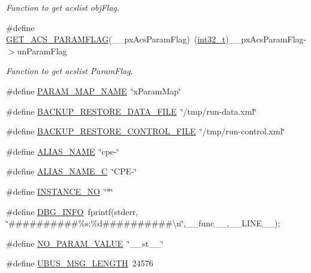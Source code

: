\begin{DoxyCompactItemize}
\begin{DoxyCompactList}\small\item\em Function to get acslist obj\-Flag. \end{DoxyCompactList}\item 
\#define \hyperlink{group__LIBHELP_ga9e0534c6e18bac60deeef94ea78f271b}{G\-E\-T\-\_\-\-A\-C\-S\-\_\-\-P\-A\-R\-A\-M\-F\-L\-A\-G}(\-\_\-\-\_\-px\-Acs\-Param\-Flag)~(\hyperlink{commondefs_8h_a32f2e37ee053cf2ce8ca28d1f74630e5}{int32\-\_\-t})\-\_\-\-\_\-px\-Acs\-Param\-Flag-\/$>$un\-Param\-Flag
\begin{DoxyCompactList}\small\item\em Function to get acslist Param\-Flag. \end{DoxyCompactList}\item 
\#define \hyperlink{group__LIBHELP_ga87909ff79ce67a556f60ca606544e57d}{P\-A\-R\-A\-M\-\_\-\-M\-A\-P\-\_\-\-N\-A\-M\-E}~\char`\"{}x\-Param\-Map\char`\"{}
\item 
\#define \hyperlink{group__LIBHELP_ga2356c4c79efdae03bcd85e11d9178a32}{B\-A\-C\-K\-U\-P\-\_\-\-R\-E\-S\-T\-O\-R\-E\-\_\-\-D\-A\-T\-A\-\_\-\-F\-I\-L\-E}~\char`\"{}/tmp/run-\/data.\-xml\char`\"{}
\item 
\#define \hyperlink{group__LIBHELP_ga0e77cc7711c428b607377d7c5fd22eb3}{B\-A\-C\-K\-U\-P\-\_\-\-R\-E\-S\-T\-O\-R\-E\-\_\-\-C\-O\-N\-T\-R\-O\-L\-\_\-\-F\-I\-L\-E}~\char`\"{}/tmp/run-\/control.\-xml\char`\"{}
\item 
\#define \hyperlink{group__LIBHELP_ga3ded1cb037978951bed86d0abbef95ac}{A\-L\-I\-A\-S\-\_\-\-N\-A\-M\-E}~\char`\"{}cpe-\/\char`\"{}
\item 
\#define \hyperlink{group__LIBHELP_gab8a772dc3a953e57a76d6616c0dbe0ef}{A\-L\-I\-A\-S\-\_\-\-N\-A\-M\-E\-\_\-\-C}~\char`\"{}C\-P\-E-\/\char`\"{}
\item 
\#define \hyperlink{group__LIBHELP_gae9e4a4b60dbba4c7d6872b208b02da0a}{I\-N\-S\-T\-A\-N\-C\-E\-\_\-\-N\-O}~\char`\"{}$\ast$\char`\"{}
\item 
\#define \hyperlink{group__LIBHELP_ga9615e001b781d55752b3d44f9bfd5162}{D\-B\-G\-\_\-\-I\-N\-F\-O}~fprintf(stderr, \char`\"{}\#\#\#\#\#\#\#\#\#\#\%s\-:\%d\#\#\#\#\#\#\#\#\#\#\textbackslash{}n\char`\"{},\-\_\-\-\_\-func\-\_\-\-\_\-,\-\_\-\-\_\-\-L\-I\-N\-E\-\_\-\-\_\-);
\item 
\#define \hyperlink{group__LIBHELP_ga7e8ff82fbeb5ab553867da272db7f59e}{N\-O\-\_\-\-P\-A\-R\-A\-M\-\_\-\-V\-A\-L\-U\-E}~\char`\"{}\-\_\-\-\_\-st\-\_\-\-\_\-\char`\"{}
\item 
\#define \hyperlink{group__LIBHELP_gaa4779e6716ca8a3d99dd1f16579dccc3}{U\-B\-U\-S\-\_\-\-M\-S\-G\-\_\-\-L\-E\-N\-G\-T\-H}~24576

\end{DoxyCompactItemize}
